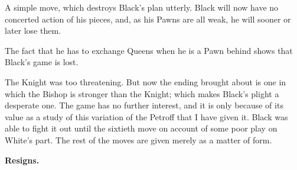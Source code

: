 \documentclass[10pt,twoside]{article}
\begin{document}

A simple move, which destroys Black's plan utterly. Black will now have no concerted action of his pieces, and, as his Pawns are all weak, he will sooner or later lose them.

\board


The fact that he has to exchange Queens when he is a Pawn behind shows that Black's game is lost.


The Knight was too threatening. But now the ending brought about is one in which the Bishop is stronger than the Knight; which makes Black's plight a desperate one. The game has no further interest, and it is only because of its value as a study of this variation of the Petroff that I have given it. Black was able to fight it out until the sixtieth move on account of some poor play on White's part. The rest of the moves are given merely as a matter of form.


\noindent\textbf{Resigns.}
\end{document}
